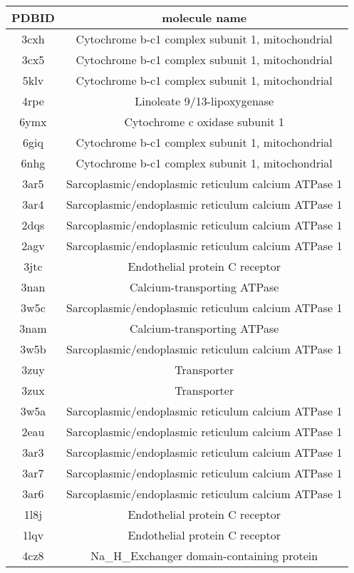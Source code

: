 \documentclass{article}
\begin{document}
\begin{table}[]
    \centering
    \begin{tabular}{c|c}
PDBID & molecule name \\
\hline
3cxh & Cytochrome b-c1 complex subunit 1, mitochondrial \\
3cx5 & Cytochrome b-c1 complex subunit 1, mitochondrial \\ 
5klv & Cytochrome b-c1 complex subunit 1, mitochondrial \\ 
4rpe & Linoleate 9/13-lipoxygenase \\ 
6ymx & Cytochrome c oxidase subunit 1 \\ 
6giq & Cytochrome b-c1 complex subunit 1, mitochondrial \\ 
6nhg & Cytochrome b-c1 complex subunit 1, mitochondrial \\ 
3ar5 & Sarcoplasmic/endoplasmic reticulum calcium ATPase 1 \\ 
3ar4 & Sarcoplasmic/endoplasmic reticulum calcium ATPase 1 \\ 
2dqs & Sarcoplasmic/endoplasmic reticulum calcium ATPase 1 \\ 
2agv & Sarcoplasmic/endoplasmic reticulum calcium ATPase 1 \\ 
3jtc & Endothelial protein C receptor \\ 
3nan & Calcium-transporting ATPase \\ 
3w5c & Sarcoplasmic/endoplasmic reticulum calcium ATPase 1 \\ 
3nam & Calcium-transporting ATPase \\ 
3w5b & Sarcoplasmic/endoplasmic reticulum calcium ATPase 1 \\ 
3zuy & Transporter \\ 
3zux & Transporter \\ 
3w5a & Sarcoplasmic/endoplasmic reticulum calcium ATPase 1 \\ 
2eau & Sarcoplasmic/endoplasmic reticulum calcium ATPase 1 \\ 
3ar3 & Sarcoplasmic/endoplasmic reticulum calcium ATPase 1 \\ 
3ar7 & Sarcoplasmic/endoplasmic reticulum calcium ATPase 1 \\ 
3ar6 & Sarcoplasmic/endoplasmic reticulum calcium ATPase 1 \\ 
1l8j & Endothelial protein C receptor \\ 
1lqv & Endothelial protein C receptor \\ 
4cz8 & Na\_H\_Exchanger domain-containing protein \\ 

\end{tabular}
\end{table}
\end{document}
